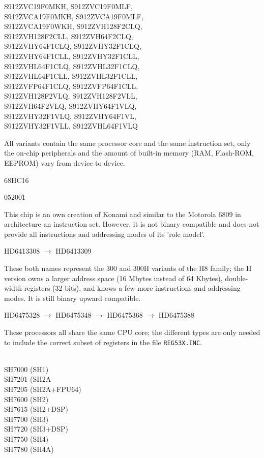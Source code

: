 \documentclass[12pt,twoside]{report}
\newcommand{\tty}[1]{{\tt #1}}
\begin{document}
\begin{cpulist}
   S912ZVC19F0MKH, S912ZVC19F0MLF,\\
\> S912ZVCA19F0MKH, S912ZVCA19F0MLF,\\
\> S912ZVCA19F0WKH, S912ZVH128F2CLQ,\\
\> S912ZVH128F2CLL, S912ZVH64F2CLQ,\\
\> S912ZVHY64F1CLQ, S912ZVHY32F1CLQ,\\
\> S912ZVHY64F1CLL, S912ZVHY32F1CLL,\\
\> S912ZVHL64F1CLQ, S912ZVHL32F1CLQ,\\
\> S912ZVHL64F1CLL, S912ZVHL32F1CLL,\\
\> S912ZVFP64F1CLQ, S912ZVFP64F1CLL,\\
\> S912ZVH128F2VLQ, S912ZVH128F2VLL,\\
\> S912ZVH64F2VLQ, S912ZVHY64F1VLQ,\\
\> S912ZVHY32F1VLQ, S912ZVHY64F1VL,\\
\> S912ZVHY32F1VLL, S912ZVHL64F1VLQ
\end{cpulist}
All variants contain the same processor core and the same
instruction set, only the on-chip peripherals and the
amount of built-in memory (RAM, Flash-ROM, EEPROM)
vary from device to device.
\begin{cpulist}
   68HC16
\end{cpulist}
\begin{cpulist}
   052001
\end{cpulist}
This chip is an own creation of Konami and similar to the
Motorola 6809 in architecture an instruction set.  However,
it is not binary compatible and does not provide all instructions
and addressing modes of its 'role model'.
\begin{cpulist}
   HD6413308 $\rightarrow$ HD6413309
\end{cpulist}
These both names represent the 300 and 300H variants of the H8
family; the H version owns a larger address space (16 Mbytes instead
of 64 Kbytes), double-width registers (32 bits), and knows a few more
instructions and addressing modes.  It is still binary upward
compatible.
\begin{cpulist}
   HD6475328 $\rightarrow$ HD6475348 $\rightarrow$ HD6475368 $\rightarrow$ HD6475388
\end{cpulist}
These processors all share the same CPU core; the different types are
only needed to include the correct subset of registers in the file
\tty{REG53X.INC}.
\begin{cpulist} \\
   SH7000 (SH1) \\
   SH7201 (SH2A \\
   SH7205 (SH2A+FPU64) \\
   SH7600 (SH2) \\
   SH7615 (SH2+DSP) \\
   SH7700 (SH3) \\
   SH7720 (SH3+DSP) \\
   SH7750 (SH4) \\
   SH7780 (SH4A) \\
\end{cpulist}
\end{document}
